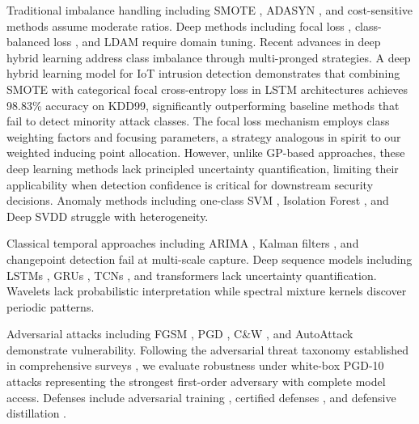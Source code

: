 \documentclass[review,12pt]{elsarticle}
\begin{document}
Traditional imbalance handling including SMOTE \cite{chawla2002smote}, ADASYN \cite{he2008adasyn}, and cost-sensitive methods \cite{elkan2001foundations} assume moderate ratios. Deep methods including focal loss \cite{lin2017focal}, class-balanced loss \cite{cui2019class}, and LDAM \cite{cao2019learning} require domain tuning. Recent advances in deep hybrid learning address class imbalance through multi-pronged strategies. A deep hybrid learning model for IoT intrusion detection \cite{aldhyani2023deep} demonstrates that combining SMOTE with categorical focal cross-entropy loss in LSTM architectures achieves 98.83\% accuracy on KDD99, significantly outperforming baseline methods that fail to detect minority attack classes. The focal loss mechanism employs class weighting factors and focusing parameters, a strategy analogous in spirit to our weighted inducing point allocation. However, unlike GP-based approaches, these deep learning methods lack principled uncertainty quantification, limiting their applicability when detection confidence is critical for downstream security decisions. Anomaly methods including one-class SVM \cite{scholkopf2001estimating}, Isolation Forest \cite{liu2008isolation}, and Deep SVDD \cite{ruff2018deep} struggle with heterogeneity.

Classical temporal approaches including ARIMA \cite{box2015time}, Kalman filters \cite{durbin2012time}, and changepoint detection \cite{adams2007bayesian} fail at multi-scale capture. Deep sequence models including LSTMs \cite{hochreiter1997long}, GRUs \cite{cho2014learning}, TCNs \cite{bai2018empirical}, and transformers \cite{vaswani2017attention} lack uncertainty quantification. Wavelets \cite{mallat1999wavelet} lack probabilistic interpretation while spectral mixture kernels \cite{wilson2013gaussian} discover periodic patterns.

Adversarial attacks including FGSM \cite{goodfellow2015explaining}, PGD \cite{madry2018towards}, C\&W \cite{carlini2017towards}, and AutoAttack \cite{croce2020reliable} demonstrate vulnerability. Following the adversarial threat taxonomy established in comprehensive surveys \cite{kim2021review}, we evaluate robustness under white-box PGD-10 attacks representing the strongest first-order adversary with complete model access. Defenses include adversarial training \cite{madry2018towards}, certified defenses \cite{cohen2019certified,gowal2018effectiveness}, and defensive distillation \cite{papernot2016distillation}.
\end{document}
